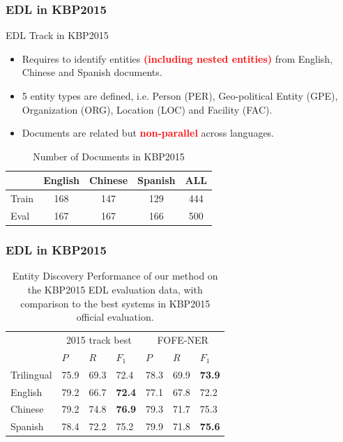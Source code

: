 \documentclass{beamer}
\begin{document}
\begin{frame}
\frametitle{EDL in KBP2015}
\begin{block}{EDL Track in KBP2015 \parencite{kbpoverview2015}}
\begin{itemize}
	\item Requires to identify entities \textbf{\textcolor{red}{(including nested entities)}} from English, Chinese and Spanish documents.
	\item 5 entity types are defined, i.e. Person (PER), Geo-political Entity (GPE), Organization (ORG), Location (LOC) and Facility (FAC).
	\item Documents are related but \textbf{\textcolor{red}{non-parallel}} across languages. 
\end{itemize}
\end{block}
\begin{table}
		\centering
		\begin{tabular}{|l|c|c|c|c|}
			\hline
			& English & Chinese & Spanish & ALL \\
			\hline
			Train & 168 & 147 & 129 & 444 \\
			Eval & 167 & 167 & 166 & 500 \\
			\hline
		\end{tabular}%
	\caption{\scriptsize Number of Documents in KBP2015}
	\label{tbl:kbp2015stat}
\end{table}
\end{frame}

\begin{frame}
\frametitle{EDL in KBP2015}
\begin{table}
	\centering
	\begin{tabular}{|l|lll|lll|}
		\hline
		\ & \multicolumn{3}{c|}{2015 track best} & \multicolumn{3}{c|}{FOFE-NER} \\
		\cline{2-7}
		\ & $P$ & $R$ & $F_{1}$ & $P$ & $R$ & $F_{1}$ \\
		\hline \hline
		Trilingual & 75.9 & 69.3 & 72.4 & 78.3 & 69.9 & \bf 73.9 \\
		English & 79.2 & 66.7 & \bf 72.4 & 77.1 & 67.8 & 72.2 \\
		Chinese & 79.2 & 74.8 & \bf 76.9 & 79.3 & 71.7 & 75.3 \\
		Spanish & 78.4 & 72.2 & 75.2 & 79.9 & 71.8 & \bf 75.6 \\
		\hline
	\end{tabular}%
	\caption{\scriptsize Entity Discovery Performance of our method on the KBP2015 EDL evaluation data, with comparison to the best systems in KBP2015 official evaluation.}
	\label{tbl:kbp2015cmp}
\end{table}
\end{frame}
\end{document}
